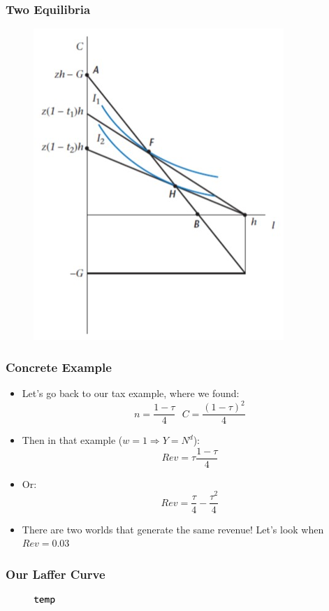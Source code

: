 \documentclass{beamer}
\begin{document}
\begin{frame}
\frametitle[alignment=center]{Two Equilibria}
\begin{figure}
\centering
\includegraphics[scale=0.5]{Figures/W_Fig_5pt18.png}
\end{figure}
\end{frame}


\begin{frame}
\frametitle[alignment=center]{Concrete Example}
\begin{itemize}
\item Let's go back to our tax example, where we found:
$$n=\frac{1-\tau}{4}\ \ \ C=\frac{(1-\tau)^2}{4}$$
\item Then in that example ($w=1\Rightarrow Y=N^d$):
$$Rev=\tau \frac{1-\tau}{4}$$
\item Or:
$$Rev=\frac{\tau}{4}-\frac{\tau^2}{4}$$
\item There are two worlds that generate the same revenue! Let's look when $Rev=0.03$ 
\end{itemize}
\end{frame}


\begin{frame}
\frametitle[alignment=center]{Our Laffer Curve}
\begin{figure}
\centering
\includegraphics[scale=0.5]{Figures/Laffer.png}
\end{figure}
\end{frame}
\end{document}
